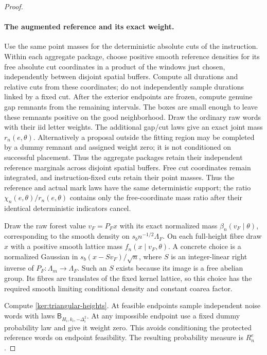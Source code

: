 \documentclass[11pt]{article}
\numberwithin{equation}{section}
\theoremstyle{definition}
\theoremstyle{remark}
\newcommand{\1}{\mathbf 1}
\begin{document}
\begin{proof}
\paragraph{The augmented reference and its exact weight.}
Use the same point masses for the deterministic absolute cuts of the
instruction. Within each aggregate package, choose positive smooth
reference densities for its free absolute cut coordinates in a
product of the windows just chosen, independently between disjoint
spatial buffers. Compute all durations and relative cuts from these
coordinates; do not independently sample durations linked by a fixed
cut. After the exterior endpoints are frozen, compute genuine gap
remnants from the remaining intervals. The boxes are small enough
to leave these remnants positive on the good neighborhood.
Draw the ordinary raw words with their iid letter weights.  The
additional gap/cut laws give an exact joint mass \(r_n(e,\theta)\).
Alternatively a proposal outside the fitting region may be completed
by a dummy remnant and assigned weight zero; it is not conditioned
on successful placement. Thus the aggregate packages retain their
independent reference marginals across disjoint spatial buffers.
Free cut coordinates remain integrated, and instruction-fixed cuts
retain their point masses. Thus the reference and actual mark laws
have the same deterministic support; the ratio
\(\chi_n(e,\theta)/r_n(e,\theta)\) contains only the free-coordinate
mass ratio after their identical deterministic indicators cancel.

Draw the raw forest value \(v_F=P_Fx\) with its exact normalized
mass \(\beta_n(v_F\mid\theta)\), corresponding to the smooth density
on \(s_bn^{-1/2}\Lambda_F\).  On each full-height fibre draw \(x\)
with a positive smooth lattice mass \(f_n(x\mid v_F,\theta)\).
A concrete choice is a normalized Gaussian in
\(s_b(x-Sv_F)/\sqrt n\), where \(S\) is an integer-linear right
inverse of \(P_F:\Lambda_m\to\Lambda_F\).  Such an \(S\) exists
because its image is a free abelian group.  Its fibres are translates
of the fixed kernel lattice, so this choice has the required smooth
limiting conditional density and constant coarea factor.

Compute \eqref{ker:triangular-heights}.  At feasible endpoints sample
independent noise words with laws
\(\mathsf B_{H_i,k_i,-\Delta_i^2}\).  At any impossible endpoint use
a fixed dummy probability law and give it weight zero.  This avoids
conditioning the protected reference words on endpoint feasibility.
The resulting probability measure is \(R_n^e\).


\end{proof}
\end{document}
